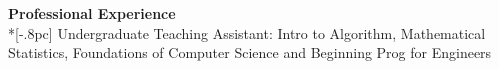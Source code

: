 
{\large \bf Professional Experience} \\*[-.8pc]
\underline{\hspace{6.3in}} 
Undergraduate Teaching Assistant:  Intro to Algorithm, Mathematical Statistics, Foundations of Computer Science and Beginning Prog for Engineers \\





